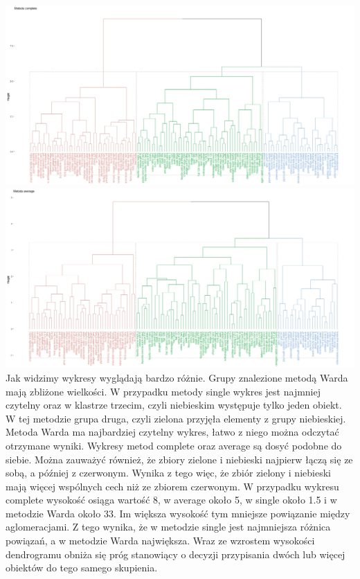 \documentclass{article}
\begin{document}
        \includegraphics[width = \textwidth]{complete_fig.jpeg}
        \includegraphics[width = \textwidth]{average_fig.jpeg}
        Jak widzimy wykresy wyglądają bardzo różnie. Grupy znalezione metodą Warda mają zbliżone wielkości. W przypadku metody single  wykres 
        jest najmniej czytelny oraz w klastrze trzecim, czyli niebieskim występuje tylko jeden obiekt. W tej metodzie grupa druga, czyli zielona 
        przyjęła elementy z grupy niebieskiej. Metoda Warda ma najbardziej czytelny wykres, łatwo z niego można odczytać otrzymane wyniki. Wykresy metod complete oraz average są dosyć podobne do siebie. Można zauważyć również, że zbiory zielone i niebieski najpierw łączą się ze sobą, a później z czerwonym. Wynika z tego więc, że zbiór zielony i niebieski mają więcej wspólnych cech niż ze zbiorem czerwonym. W przypadku wykresu complete wysokość osiąga wartość 8, w average około 5, w single około 1.5 i w metodzie Warda około 33. Im większa wysokość tym mniejsze powiązanie między aglomeracjami. Z tego wynika, że w metodzie single jest najmniejsza różnica powiązań, a w metodzie Warda największa. Wraz ze wzrostem wysokości dendrogramu obniża się próg stanowiący o decyzji przypisania dwóch lub więcej obiektów do tego samego skupienia.
\end{document}
